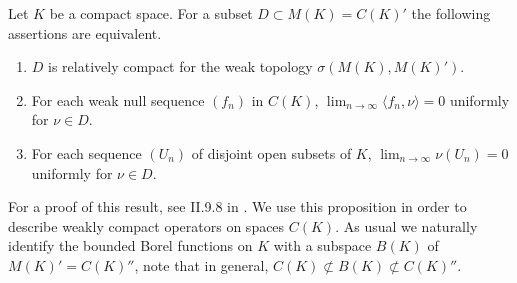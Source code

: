 \begin{proposition}\label{prop:b4-2.3}
	Let $K$ be a compact space.
	For a subset $D \subset M(K) = C(K)'$ the following assertions are equivalent.
	
	\begin{enumerate}[\upshape (a)]
		\item 
		$D$ is relatively compact for the weak topology $\sigma(M(K),M(K)')$.
	
		\item 
		For each weak null sequence $(f_n)$ in $C(K)$, $\lim_{n\to\infty}\langle f_n,\nu \rangle = 0$ uniformly for $\nu \in D$.
	
		\item 
		For each sequence $(U_n)$ of disjoint open subsets of $K$, 
		$\lim_{n\to\infty}\nu(U_n) = 0$ uniformly for $\nu \in D$.
		\end{enumerate}
\end{proposition}
For a proof of this result, see \eg II.9.8 in \citet{schaefer:1974}.
We use this proposition in order to describe weakly compact operators on spaces $C(K)$.
As usual we naturally identify the bounded Borel functions on $K$ with a subspace $B(K)$ of $M(K)' = C(K)''$, note that in
general, $C(K) \not\subset B(K) \not\subset C(K)''$.

